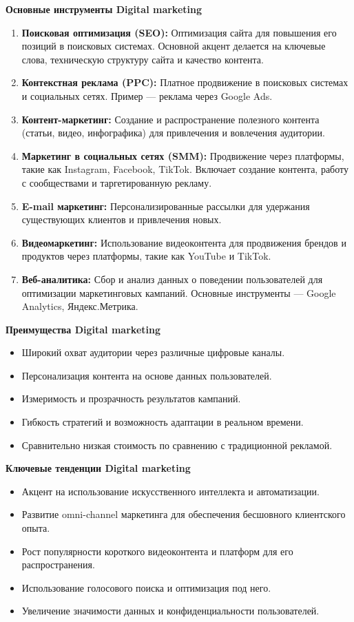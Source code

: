 \textbf{Основные инструменты Digital marketing}
\begin{enumerate}
    \item \textbf{Поисковая оптимизация (SEO):} Оптимизация сайта для повышения его позиций в поисковых системах. Основной акцент делается на ключевые слова, техническую структуру сайта и качество контента.
    \item \textbf{Контекстная реклама (PPC):} Платное продвижение в поисковых системах и социальных сетях. Пример — реклама через Google Ads.
    \item \textbf{Контент-маркетинг:} Создание и распространение полезного контента (статьи, видео, инфографика) для привлечения и вовлечения аудитории.
    \item \textbf{Маркетинг в социальных сетях (SMM):} Продвижение через платформы, такие как Instagram, Facebook, TikTok. Включает создание контента, работу с сообществами и таргетированную рекламу.
    \item \textbf{E-mail маркетинг:} Персонализированные рассылки для удержания существующих клиентов и привлечения новых.
    \item \textbf{Видеомаркетинг:} Использование видеоконтента для продвижения брендов и продуктов через платформы, такие как YouTube и TikTok.
    \item \textbf{Веб-аналитика:} Сбор и анализ данных о поведении пользователей для оптимизации маркетинговых кампаний. Основные инструменты --- Google Analytics, Яндекс.Метрика.
\end{enumerate}

\textbf{Преимущества Digital marketing}
\begin{itemize}
    \item Широкий охват аудитории через различные цифровые каналы.
    \item Персонализация контента на основе данных пользователей.
    \item Измеримость и прозрачность результатов кампаний.
    \item Гибкость стратегий и возможность адаптации в реальном времени.
    \item Сравнительно низкая стоимость по сравнению с традиционной рекламой.
\end{itemize}

\textbf{Ключевые тенденции Digital marketing}
\begin{itemize}
    \item Акцент на использование искусственного интеллекта и автоматизации.
    \item Развитие omni-channel маркетинга для обеспечения бесшовного клиентского опыта.
    \item Рост популярности короткого видеоконтента и платформ для его распространения.
    \item Использование голосового поиска и оптимизация под него.
    \item Увеличение значимости данных и конфиденциальности пользователей.
\end{itemize}

\pagebreak
